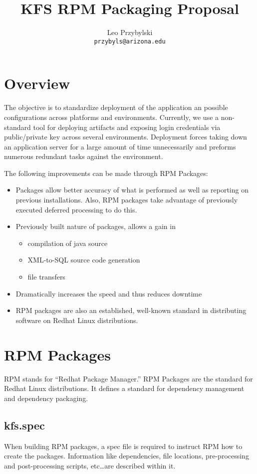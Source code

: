 \documentclass[12pt,notitlepage]{article}
\author{Leo Przybylski \\
\texttt{przybyls@arizona.edu}}
\title{KFS RPM Packaging Proposal}
\begin{document}
\maketitle

\lstset{basicstyle=\small,
  breaklines=true,
  includerangemarker=false}

\section{Overview}
The objective is to standardize deployment of the application an possible configurations across 
platforms and environments. Currently, we use a non-standard tool for deploying artifacts and exposing
login credentials via public/private key across several environments. Deployment forces taking down an 
application server for a large amount of time unnecessarily and preforms numerous redundant tasks against
the environment. 

The following improvements can be made through RPM Packages:

\begin{itemize}
  \item Packages allow better accuracy of what is performed as well as reporting on previous installations. Also, RPM packages take advantage of previously executed deferred processing to do this. 
  \item Previously built nature of packages, allows a gain in 
    \begin{itemize}
      \item compilation of java source 
      \item XML-to-SQL source code generation
      \item file transfers
    \end{itemize}
  \item Dramatically increases the speed and thus reduces downtime
  \item RPM packages are also an established, well-known standard in distributing software on Redhat Linux distributions.
\end{itemize}

\section{RPM Packages}
RPM stands for ``Redhat Package Manager.'' RPM Packages are the standard for Redhat Linux distributions.
It defines a standard for dependency management and dependency packaging.

\subsection{kfs.spec}
When building RPM packages, a spec file is required to instruct RPM how to create the packages. Information like
dependencies, file locations, pre-processing and post-processing scripts, etc\ldots are described within it.
\end{document}
